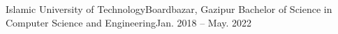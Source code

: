 
\resumeSubheading
    {Islamic  University of Technology}{Boardbazar, Gazipur}
    {Bachelor of Science in Computer Science and Engineering}{Jan. 2018 -- May. 2022}
    \resumeItemListStart
    \resumeItemListEnd